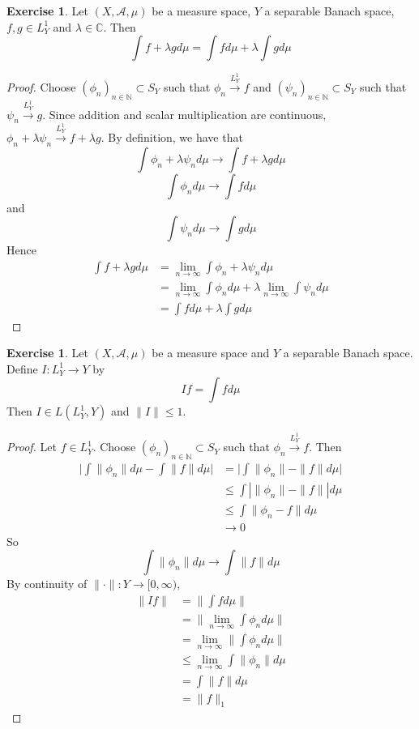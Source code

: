 \documentclass[12pt]{amsart}
\theoremstyle{definition}
\newtheorem{ex}[definition]{Exercise}
\newcommand{\lam}{\lambda}
\newcommand{\C}{\mathbb{C}}
\newcommand{\N}{\mathbb{N}}
\newcommand{\MA}{\mathcal{A}}
\newcommand{\Rg}{[0,\infty)}
\newcommand{\limn}{\lim \limits_{n \rightarrow \infty}}
\newcommand{\conv}[1]{\xrightarrow{#1}}
\newcommand{\lex}[1]{\label{ex:#1}}
\begin{document}
	\begin{ex} \lex{00000} 
	Let $(X, \MA, \mu)$ be a measure space, $Y$ a separable Banach space, $f,g \in L^1_Y$ and $\lam \in \C$. Then $$\int f+\lam g d\mu = \int f d \mu + \lam \int g d\mu$$
	\end{ex}
	
	\begin{proof}
	Choose $(\phi_n)_{n \in \N} \subset S_Y$ such that $\phi_n \conv{L^1_Y} f$ and $(\psi_n)_{n \in \N} \subset S_Y$ such that $\psi_n \conv{L^1_Y} g$. Since addition and  scalar multiplication are continuous, $\phi_n + \lam \psi_n \conv{L^1_Y} f+\lam g$. By definition, we have that $$\int \phi_n + \lam \psi_n  d\mu \rightarrow \int f+\lam g d\mu $$ $$\int \phi_n d\mu \rightarrow \int f d\mu$$ and $$ \int \psi_n d\mu \rightarrow \int g d\mu$$ 
	Hence 
	\begin{align*}
	\int f+ \lam g d\mu 
	&= \limn \int \phi_n + \lam \psi_n  d\mu \\
	&= \limn \int \phi_n d\mu + \lam \limn \int \psi_n  d\mu \\
	&= \int f d\mu + \lam \int g d\mu
	\end{align*}
	\end{proof}
	
	\begin{ex} \lex{00000} 
	Let $(X, \MA, \mu)$ be a measure space and $Y$ a separable Banach space. Define $I: L^1_Y \rightarrow Y$ by $$If = \int f d\mu$$
	Then $I \in L(L^1_Y, Y)$ and $\|I\| \leq 1$.
	\end{ex}
	
	\begin{proof}
	Let $f \in L^1_Y$. Choose $(\phi_n)_{n \in \N} \subset S_Y$ such that $\phi_n \conv{L^1_Y} f$. Then 
	\begin{align*}
	\bigg | \int \| \phi_n \| d \mu - \int \| f\| d\mu \bigg |
	&= \bigg | \int \| \phi_n \| - \| f\| d\mu \bigg | \\
	& \leq \int |\| \phi_n \| - \| f\| | d\mu \\
	& \leq  \int \| \phi_n - f\| d\mu \\
	& \rightarrow 0
	\end{align*}
	So  $$ \int \| \phi_n \| d \mu \rightarrow  \int \| f \| d \mu$$
	By continuity of $\|\cdot\|:Y \rightarrow \Rg$,
	\begin{align*}
	\|I f\|
	& = \bigg \| \int f d\mu \bigg \| \\
	&= \bigg \| \limn \int \phi_n d\mu \bigg \| \\
	&= \limn  \bigg \| \int \phi_n d\mu \bigg \| \\
	& \leq \limn \int \| \phi_n \| d \mu \\
	&= \int \| f \| d\mu  \\
	&= \|f\|_1
	\end{align*}
	\end{proof}
\end{document}
